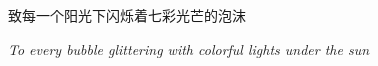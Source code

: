 \thispagestyle{empty}
\vspace*{\fill}
\begin{center}
    \Large 致每一个阳光下闪烁着七彩光芒的泡沫

    \vspace{2ex}

    \large \textit{To every bubble glittering with colorful lights under the sun}
\end{center}
\vspace*{\fill}
